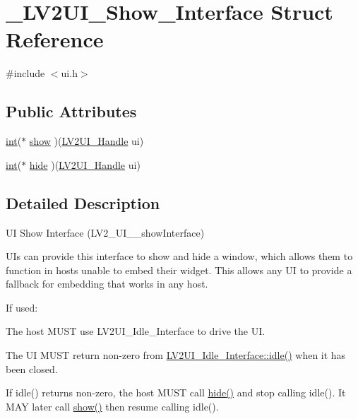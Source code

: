 \hypertarget{struct___l_v2_u_i___show___interface}{}\section{\+\_\+\+L\+V2\+U\+I\+\_\+\+Show\+\_\+\+Interface Struct Reference}
\label{struct___l_v2_u_i___show___interface}


{\ttfamily \#include $<$ui.\+h$>$}

\subsection*{Public Attributes}
\begin{DoxyCompactItemize}
\item 
\hyperlink{xmltok_8h_a5a0d4a5641ce434f1d23533f2b2e6653}{int}($\ast$ \hyperlink{struct___l_v2_u_i___show___interface_ab3e6254c8f5396051a76ee841ead411c}{show} )(\hyperlink{ui_8h_aea72a15db080a61e5e222fed84047e90}{L\+V2\+U\+I\+\_\+\+Handle} ui)
\item 
\hyperlink{xmltok_8h_a5a0d4a5641ce434f1d23533f2b2e6653}{int}($\ast$ \hyperlink{struct___l_v2_u_i___show___interface_aa3400c3a2e10bcf7db587f3d3fdf872c}{hide} )(\hyperlink{ui_8h_aea72a15db080a61e5e222fed84047e90}{L\+V2\+U\+I\+\_\+\+Handle} ui)
\end{DoxyCompactItemize}


\subsection{Detailed Description}
UI Show Interface (L\+V2\+\_\+\+U\+I\+\_\+\+\_\+show\+Interface)

U\+Is can provide this interface to show and hide a window, which allows them to function in hosts unable to embed their widget. This allows any UI to provide a fallback for embedding that works in any host.

If used\+:
\begin{DoxyItemize}
\item The host M\+U\+ST use L\+V2\+U\+I\+\_\+\+Idle\+\_\+\+Interface to drive the UI.
\item The UI M\+U\+ST return non-\/zero from \hyperlink{struct___l_v2_u_i___idle___interface_ae8365fae89d5951f6727f59eebc15dac}{L\+V2\+U\+I\+\_\+\+Idle\+\_\+\+Interface\+::idle()} when it has been closed.
\item If idle() returns non-\/zero, the host M\+U\+ST call \hyperlink{struct___l_v2_u_i___show___interface_aa3400c3a2e10bcf7db587f3d3fdf872c}{hide()} and stop calling idle(). It M\+AY later call \hyperlink{struct___l_v2_u_i___show___interface_ab3e6254c8f5396051a76ee841ead411c}{show()} then resume calling idle(). 
\end{DoxyItemize}


